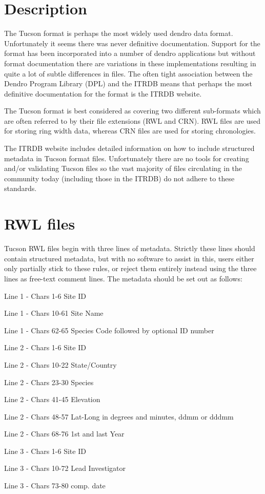 \section{Description}
The Tucson format is perhaps the most widely used dendro data format. Unfortunately it seems there was never definitive documentation. Support for the format has been incorporated into a number of dendro applications but without format documentation there are variations in these implementations resulting in quite a lot of subtle differences in files. The often tight association between the Dendro Program Library (DPL) and the ITRDB means that perhaps the most definitive documentation for the format is the ITRDB website.

The Tucson format is best considered as covering two different sub-formats which are often referred to by their file extensions (RWL and CRN). RWL files are used for storing ring width data, whereas CRN files are used for storing chronologies.

The ITRDB website includes detailed information on how to include structured metadata in Tucson format files. Unfortunately there are no tools for creating and/or validating Tucson files so the vast majority of files circulating in the community today (including those in the ITRDB) do not adhere to these standards. 

\section{RWL files}
Tucson RWL files begin with three lines of metadata. Strictly these lines should contain structured metadata, but with no software to assist in this, users either only partially stick to these rules, or reject them entirely instead using the three lines as free-text comment lines. The metadata should be set out as follows:

\begin{itemize*}
    \item  Line 1 - Chars 1-6 Site ID
    \item  Line 1 - Chars 10-61 Site Name
    \item  Line 1 - Chars 62-65 Species Code followed by optional ID number
    \item  Line 2 - Chars 1-6 Site ID
    \item  Line 2 - Chars 10-22 State/Country
    \item  Line 2 - Chars 23-30 Species
    \item  Line 2 - Chars 41-45 Elevation
    \item  Line 2 - Chars 48-57 Lat-Long in degrees and minutes, ddmm or dddmm
    \item  Line 2 - Chars 68-76 1st and last Year
    \item  Line 3 - Chars 1-6 Site ID
    \item  Line 3 - Chars 10-72 Lead Investigator
    \item  Line 3 - Chars 73-80 comp. date 
\end{itemize*}


